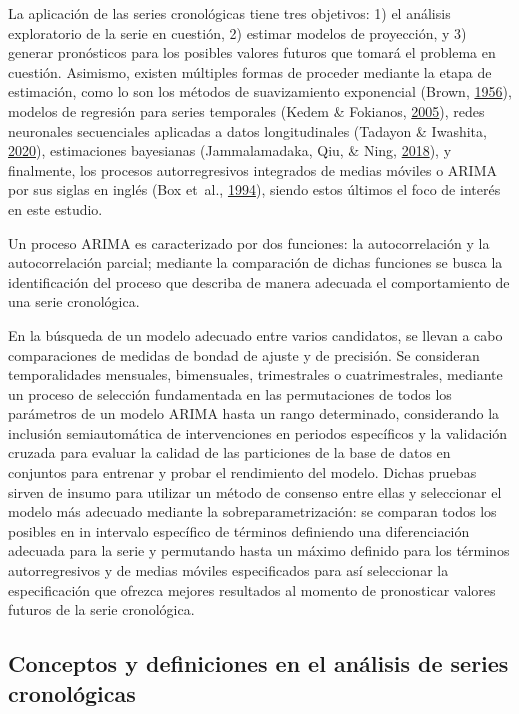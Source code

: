 \documentclass[
]{article}
\begin{document}
La aplicación de las series cronológicas tiene tres objetivos: 1) el
análisis exploratorio de la serie en cuestión, 2) estimar modelos de
proyección, y 3) generar pronósticos para los posibles valores futuros
que tomará el problema en cuestión. Asimismo, existen múltiples formas
de proceder mediante la etapa de estimación, como lo son los métodos de
suavizamiento exponencial (Brown, \protect\hyperlink{ref-brown}{1956}),
modelos de regresión para series temporales (Kedem \& Fokianos,
\protect\hyperlink{ref-kedem}{2005}), redes neuronales secuenciales
aplicadas a datos longitudinales (Tadayon \& Iwashita,
\protect\hyperlink{ref-redes}{2020}), estimaciones bayesianas
(Jammalamadaka, Qiu, \& Ning, \protect\hyperlink{ref-bayes}{2018}), y
finalmente, los procesos autorregresivos integrados de medias móviles o
ARIMA por sus siglas en inglés (Box et~al.,
\protect\hyperlink{ref-box-jenkins}{1994}), siendo estos últimos el foco
de interés en este estudio.

Un proceso ARIMA es caracterizado por dos funciones: la autocorrelación
y la autocorrelación parcial; mediante la comparación de dichas
funciones se busca la identificación del proceso que describa de manera
adecuada el comportamiento de una serie cronológica.

En la búsqueda de un modelo adecuado entre varios candidatos, se llevan
a cabo comparaciones de medidas de bondad de ajuste y de precisión. Se
consideran temporalidades mensuales, bimensuales, trimestrales o
cuatrimestrales, mediante un proceso de selección fundamentada en las
permutaciones de todos los parámetros de un modelo ARIMA hasta un rango
determinado, considerando la inclusión semiautomática de intervenciones
en periodos específicos y la validación cruzada para evaluar la calidad
de las particiones de la base de datos en conjuntos para entrenar y
probar el rendimiento del modelo. Dichas pruebas sirven de insumo para
utilizar un método de consenso entre ellas y seleccionar el modelo más
adecuado mediante la sobreparametrización: se comparan todos los
posibles en in intervalo específico de términos definiendo una
diferenciación adecuada para la serie y permutando hasta un máximo
definido para los términos autorregresivos y de medias móviles
especificados para así seleccionar la especificación que ofrezca mejores
resultados al momento de pronosticar valores futuros de la serie
cronológica.

\subsection{Conceptos y definiciones en el análisis de series cronológicas}
\end{document}
